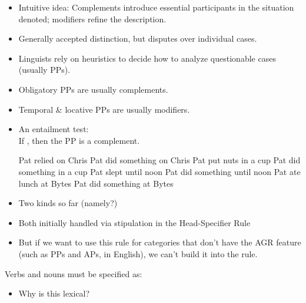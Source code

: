 \documentclass[a4paper,landscape,headrule,footrule]{foils}
\begin{document}
\begin{itemize}
\item Intuitive idea: Complements introduce
essential participants in the situation denoted;
modifiers refine the description.
\item Generally accepted distinction, but disputes
over individual cases.
\item Linguists rely on heuristics to decide how to
analyze questionable cases (usually PPs).
\end{itemize}


\begin{itemize}
\item Obligatory PPs are usually complements.
\item Temporal \& locative PPs are usually modifiers.
\item An entailment test:
\\ If , then the PP is a complement.
\begin{exe}
  \ix Pat relied on Chris    \ngv Pat did something on Chris
  \ix Pat put nuts in a cup  \ngv Pat did something in a cup
  \ix Pat slept until noon   \ent Pat did something until noon
  \ix Pat ate lunch at Bytes \ent Pat did something at Bytes
  \end{exe}
\end{itemize}

\MyLogo{}
\begin{itemize}
\item Two kinds so far (namely?)
\item Both initially handled via stipulation in the
Head-Specifier Rule
\item But if we want to use this rule for categories
that don’t have the AGR feature (such as PPs
and APs, in English), we can’t build it into
the rule.
\end{itemize}

Verbs and nouns must be specified as:
\begin{center}
\end{center}

\begin{itemize}
\item Why is this lexical?
\end{itemize}
\end{document}
